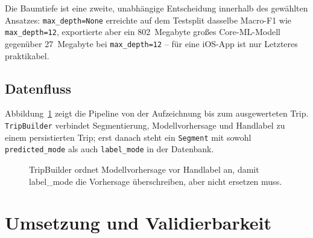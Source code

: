 \documentclass[11pt,a4paper,oneside]{article}
\begin{document}
Die Baumtiefe ist eine zweite, unabhängige Entscheidung innerhalb des
gewählten Ansatzes: \texttt{max\_depth=None} erreichte auf dem
Testsplit dasselbe Macro-F1 wie \texttt{max\_depth=12}, exportierte aber ein
802~Megabyte großes Core-ML-Modell gegenüber 27~Megabyte bei
\texttt{max\_depth=12} -- für eine iOS-App ist nur Letzteres praktikabel.

\subsection{Datenfluss}

Abbildung~\ref{fig:datenfluss} zeigt die Pipeline von der Aufzeichnung bis
zum ausgewerteten Trip. \texttt{TripBuilder} verbindet Segmentierung,
Modellvorhersage und Handlabel zu einem persistierten Trip; erst danach
steht ein \texttt{Segment} mit sowohl \texttt{predicted\_mode} als auch
\texttt{label\_mode} in der Datenbank.

\begin{figure}[htbp]
\centering
{}
\caption{TripBuilder ordnet Modellvorhersage vor Handlabel an, damit
label\_mode die Vorhersage überschreiben, aber nicht ersetzen muss.}
\label{fig:datenfluss}
\end{figure}

\section{Umsetzung und Validierbarkeit}
\label{sec:validierung}
\end{document}
